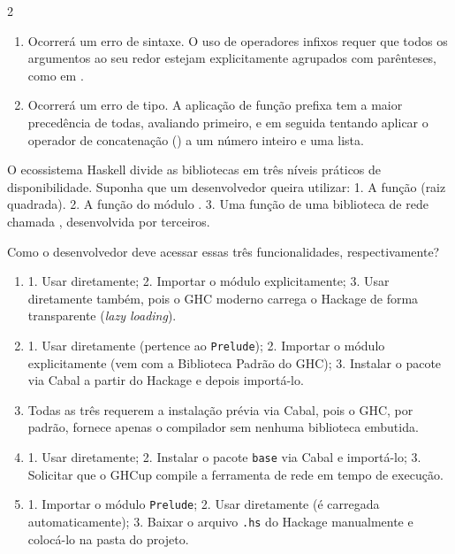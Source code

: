 \documentclass[a4paper,10pt,brazil]{article}
\begin{document}
\begin{multicols}{2}
\begin{enumerate}
  \item Ocorrerá um erro de sintaxe. O uso de operadores infixos requer que todos os argumentos ao seu redor estejam explicitamente agrupados com parênteses, como em .

  \item Ocorrerá um erro de tipo. A aplicação de função prefixa tem a maior precedência de todas, avaliando  primeiro, e em seguida tentando aplicar o operador de concatenação (\haskellinline{++}) a um número inteiro e uma lista.


\end{enumerate}

O ecossistema Haskell divide as bibliotecas em três níveis práticos de disponibilidade. Suponha que um desenvolvedor queira utilizar:
1. A função  (raiz quadrada).
2. A função  do módulo .
3. Uma função de uma biblioteca de rede chamada , desenvolvida por terceiros.

Como o desenvolvedor deve acessar essas três funcionalidades, respectivamente?

\begin{enumerate}
  \item 1. Usar diretamente; 2. Importar o módulo explicitamente; 3. Usar diretamente também, pois o GHC moderno carrega o Hackage de forma transparente (\emph{lazy loading}).

  \item 1. Usar diretamente (pertence ao \texttt{Prelude}); 2. Importar o módulo explicitamente (vem com a Biblioteca Padrão do GHC); 3. Instalar o pacote via Cabal a partir do Hackage e depois importá-lo.

  \item Todas as três requerem a instalação prévia via Cabal, pois o GHC, por padrão, fornece apenas o compilador sem nenhuma biblioteca embutida.

  \item 1. Usar diretamente; 2. Instalar o pacote \texttt{base} via Cabal e importá-lo; 3. Solicitar que o GHCup compile a ferramenta de rede em tempo de execução.

  \item 1. Importar o módulo \texttt{Prelude}; 2. Usar diretamente (é carregada automaticamente); 3. Baixar o arquivo \texttt{.hs} do Hackage manualmente e colocá-lo na pasta do projeto.



\end{enumerate}
\end{multicols}
\end{document}
